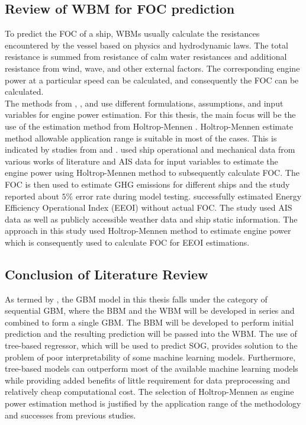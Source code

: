 \subsection{Review of WBM for FOC prediction}\label{sec:wbm_review}

To predict the FOC of a ship, WBMs usually calculate the resistances encountered by the vessel based on physics and hydrodynamic laws. The total resistance is summed from resistance of calm water resistances and additional resistance from wind, wave, and other external factors. The corresponding engine power at a particular speed can be calculated, and consequently the FOC can be calculated.\\

The methods from , , and  use different formulations, assumptions, and input variables for engine power estimation. For this thesis, the main focus will be the use of the estimation method from Holtrop-Mennen . Holtrop-Mennen estimate method allowable application range is suitable in most of the cases. This is indicated by studies from  and .  used ship operational and mechanical data from various works of literature and AIS data for input variables to estimate the engine power using Holtrop-Mennen method to subsequently calculate FOC. The FOC is then used to estimate GHG emissions for different ships and the study reported about $5\%$ error rate during model testing.  successfully estimated Energy Efficiency Operational Index (EEOI) without actual FOC. The study used AIS data as well as publicly accessible weather data and ship static information. The approach in this study used Holtrop-Mennen method to estimate engine power which is consequently used to calculate FOC for EEOI estimations.\\ 

\subsection{Conclusion of Literature Review}\label{sec:lit_review_conclusion}

As termed by , the GBM model in this thesis falls under the category of sequential GBM, where the BBM and the WBM will be developed in series and combined to form a single GBM. The BBM will be developed to perform initial prediction and the resulting prediction will be passed into the WBM. The use of tree-based regressor, which will be used to predict SOG, provides solution to the problem of poor interpretability of some machine learning models. Furthermore, tree-based models can outperform most of the available machine learning models while providing added benefits of little requirement for data preprocessing and relatively cheap computational cost. The selection of Holtrop-Mennen as engine power estimation method is justified by the application range of the methodology and successes from previous studies.\\ 

